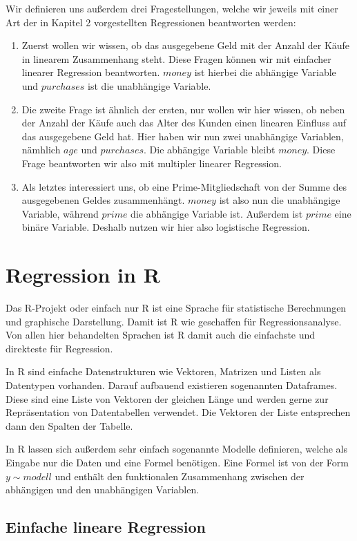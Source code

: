 Wir definieren uns außerdem drei Fragestellungen, welche wir jeweils mit einer Art der in Kapitel 2 vorgestellten Regressionen beantworten werden:
\begin{enumerate}
  \item Zuerst wollen wir wissen, ob das ausgegebene Geld mit der Anzahl der Käufe in linearem Zusammenhang steht. Diese Fragen können wir mit einfacher linearer Regression beantworten. $money$ ist hierbei die abhängige Variable und $purchases$ ist die unabhängige Variable.
  \item Die zweite Frage ist ähnlich der ersten, nur wollen wir hier wissen, ob neben der Anzahl der Käufe auch das Alter des Kunden einen linearen Einfluss auf das ausgegebene Geld hat. Hier haben wir nun zwei unabhängige Variablen, nämhlich $age$ und $purchases$. Die abhängige Variable bleibt $money$. Diese Frage beantworten wir also mit multipler linearer Regression.
  \item Als letztes interessiert uns, ob eine Prime-Mitgliedschaft von der Summe des ausgegebenen Geldes zusammenhängt. $money$ ist also nun die unabhängige Variable, während $prime$ die abhängige Variable ist. Außerdem ist $prime$ eine binäre Variable. Deshalb nutzen wir hier also logistische Regression.
\end{enumerate}

\section{Regression in R}
Das R-Projekt oder einfach nur R ist eine Sprache für statistische Berechnungen und graphische Darstellung. Damit ist R wie geschaffen für Regressionsanalyse. Von allen hier behandelten Sprachen ist R damit auch die einfachste und direkteste für Regression.

In R sind einfache Datenstrukturen wie Vektoren, Matrizen und Listen als Datentypen vorhanden. Darauf aufbauend existieren sogenannten Dataframes. Diese sind eine Liste von Vektoren der gleichen Länge und werden gerne zur Repräsentation von Datentabellen verwendet. Die Vektoren der Liste entsprechen dann den Spalten der Tabelle.

In R lassen sich außerdem sehr einfach sogenannte Modelle definieren, welche als Eingabe nur die Daten und eine Formel benötigen. Eine Formel ist von der Form $y \sim modell$ und enthält den funktionalen Zusammenhang zwischen der abhängigen und den unabhängigen Variablen.

\subsection{Einfache lineare Regression}


